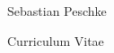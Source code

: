 \documentclass[
    10pt, %
]{FreemanCV}
\begin{document}
    \begin{paracol}{2} %


        \parbox[][0.11\textheight][c]{\linewidth}{ %
            \centering %

            {\sffamily\Huge Sebastian Peschke} %

            \medskip %

            {\cursivefont\Huge\textcolor{headings}{Curriculum Vitae}}

            \vfill %
        }







%
%





\end{paracol}
\end{document}
